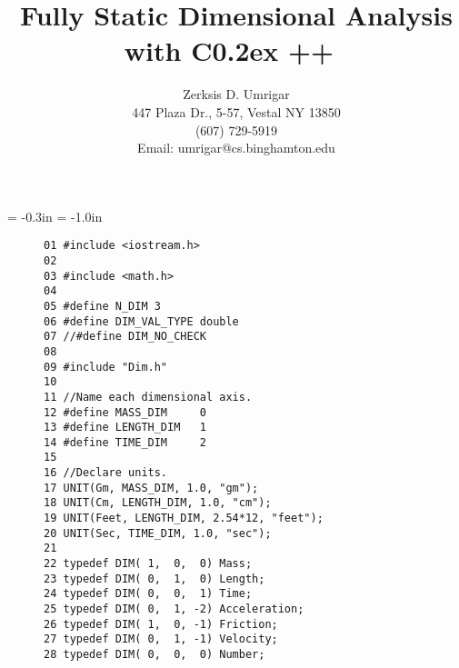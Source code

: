 \batchmode
{}
\makeatletter

\pagestyle{empty}
\footskip 2in 

\hoffset= -0.3in
\voffset= -1.0in
\setlength{\textwidth}{6.5in}\setlength{\textheight}{9in}
\setlength{\oddsidemargin}{0.3in}\setlength{\evensidemargin}{0.3in}
\setlength{\parindent}{0pt}\setlength{\parskip}{1.5ex}







\title{Fully Static Dimensional Analysis with C\raise 0.2ex \hbox{++}\ }
\author{
Zerksis D. Umrigar\\ 
447 Plaza Dr., 5-57, Vestal NY 13850\\ 
(607) 729-5919\\ 
Email: umrigar@cs.binghamton.edu
}
\date{}

\newcommand {\cpp}{C\raise 0.2ex \hbox{++}}

\newcommand {\gpp}{G\raise 0.2ex \hbox{++}}

\newcommand {\meter}{\hbox{Meter}}

\newcommand {\kg}{\hbox{Kg}}

\newcommand {\second}{\hbox{Sec}}

\makeatother
\newenvironment{tex2html_wrap}{}{}
\newwrite\lthtmlwrite
\def\lthtmltypeout#1{{\let\protect\string\immediate\write\lthtmlwrite{#1}}}%
\newbox\sizebox

\pagestyle{empty}
{\newpage
\clearpage
\samepage \begin{figure}{\footnotesize
\begin{verbatim}01 #include <iostream.h>
02 
03 #include <math.h>
04 
05 #define N_DIM 3
06 #define DIM_VAL_TYPE double
07 //#define DIM_NO_CHECK
08 
09 #include "Dim.h"
10 
11 //Name each dimensional axis.
12 #define MASS_DIM     0
13 #define LENGTH_DIM   1
14 #define TIME_DIM     2
15 
16 //Declare units.
17 UNIT(Gm, MASS_DIM, 1.0, "gm");
18 UNIT(Cm, LENGTH_DIM, 1.0, "cm");
19 UNIT(Feet, LENGTH_DIM, 2.54*12, "feet");
20 UNIT(Sec, TIME_DIM, 1.0, "sec");
21 
22 typedef DIM( 1,  0,  0) Mass;
23 typedef DIM( 0,  1,  0) Length;
24 typedef DIM( 0,  0,  1) Time;
25 typedef DIM( 0,  1, -2) Acceleration;
26 typedef DIM( 1,  0, -1) Friction;
27 typedef DIM( 0,  1, -1) Velocity;
28 typedef DIM( 0,  0,  0) Number;\end{verbatim}
}


\label{Fig:Dec}
\end{figure}
}

